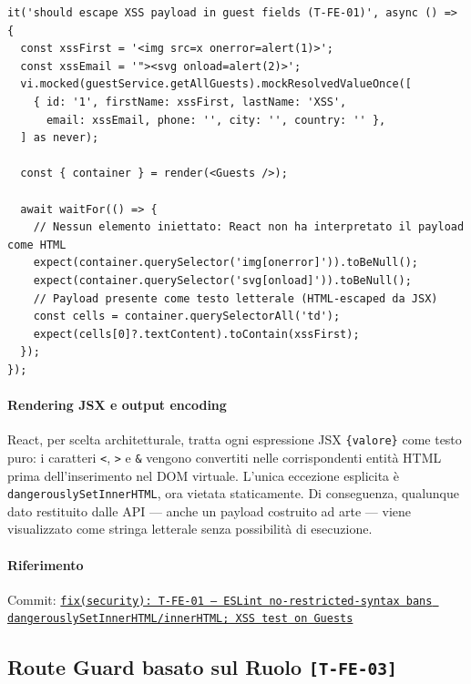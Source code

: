 ﻿\documentclass[a4paper,12pt]{report}
\newcommand{\commitref}[2]{\texttt{\small \href{https://github.com/diegoandruccioli/hotel-pms/commit/#1}{#2}}}
\newcommand{\threat}[1]{\texttt{\small\textcolor{vulnred}{[#1]}}}
\begin{document}
\begin{securebox}[title={Guests.test.tsx --- test di regressione XSS (T-FE-01)}]
\begin{lstlisting}[style=typescript]
it('should escape XSS payload in guest fields (T-FE-01)', async () => {
  const xssFirst = '<img src=x onerror=alert(1)>';
  const xssEmail = '"><svg onload=alert(2)>';
  vi.mocked(guestService.getAllGuests).mockResolvedValueOnce([
    { id: '1', firstName: xssFirst, lastName: 'XSS',
      email: xssEmail, phone: '', city: '', country: '' },
  ] as never);

  const { container } = render(<Guests />);

  await waitFor(() => {
    // Nessun elemento iniettato: React non ha interpretato il payload come HTML
    expect(container.querySelector('img[onerror]')).toBeNull();
    expect(container.querySelector('svg[onload]')).toBeNull();
    // Payload presente come testo letterale (HTML-escaped da JSX)
    const cells = container.querySelectorAll('td');
    expect(cells[0]?.textContent).toContain(xssFirst);
  });
});
\end{lstlisting}
\end{securebox}

\paragraph{Rendering JSX e output encoding}
React, per scelta architetturale, tratta ogni espressione JSX \texttt{\{valore\}}
come testo puro: i caratteri \texttt{<}, \texttt{>} e \texttt{\&} vengono convertiti
nelle corrispondenti entità HTML prima dell'inserimento nel DOM virtuale.
L'unica eccezione esplicita è \texttt{dangerouslySetInnerHTML}, ora vietata
staticamente. Di conseguenza, qualunque dato restituito dalle API --- anche un payload
costruito ad arte --- viene visualizzato come stringa letterale senza possibilità di
esecuzione.

\paragraph{Riferimento} Commit: \commitref{3655906}{fix(security): T-FE-01 --- ESLint no-restricted-syntax bans dangerouslySetInnerHTML/innerHTML; XSS test on Guests}

\subsection{Route Guard basato sul Ruolo \threat{T-FE-03}}
\end{document}
